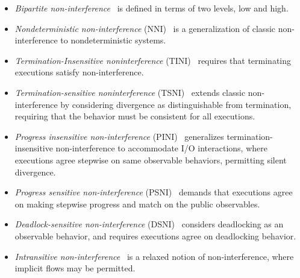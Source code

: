 \begin{itemize}

\item\emph{Bipartite non-interference}~\cite{aceto2024}
is defined in terms of two levels, low and high.

\item\emph{Nondeterministic non-interference} (NNI)~\cite{focardi1997}
is a generalization of classic non-interference to nondeterministic systems.

\item\emph{Termination-Insensitive noninterference} (TINI)~\cite{hedin2012}
requires that terminating executions satisfy non-interference.

\item\emph{Termination-sensitive noninterference} (TSNI)~\cite{hedin2012}
extends classic non-interference by considering divergence as distinguishable from termination,
requiring that the behavior must be consistent for all executions.

\item\emph{Progress insensitive non-interference} (PINI)~\cite{bay2020}
generalizes termination-insensitive non-interference to accommodate I/O interactions,
where executions agree stepwise on same observable behaviors, permitting silent divergence.

\item\emph{Progress sensitive non-interference} (PSNI)~\cite{hedin2012}
demands that executions agree on making stepwise progress and match on the public observables.

\item\emph{Deadlock-sensitive non-interference} (DSNI)~\cite{vandenheuvel2024}
considers deadlocking as an observable behavior,
and requires executions agree on deadlocking behavior.

\item\emph{Intransitive non-interference}~\cite{roscoe1999}
is a relaxed notion of non-interference, where implicit flows may be permitted.


\end{itemize}
